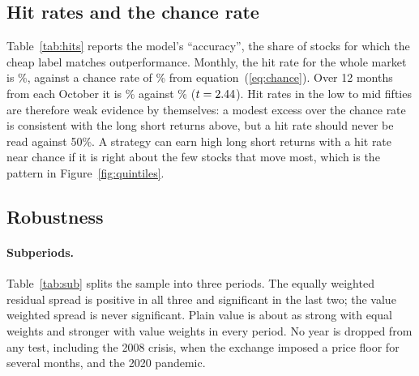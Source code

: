 \documentclass[11pt]{article}
\begin{document}
\subsection{Hit rates and the chance rate}

Table~\ref{tab:hits} reports the model's ``accuracy'', the share of stocks for which the cheap label
matches outperformance. Monthly, the hit rate for the whole market is \HitM\%, against a chance rate
of \BaseM\% from equation~(\ref{eq:chance}). Over 12 months from each October it is \HitA\% against
\BaseA\% ($t = 2.44{}$). Hit rates in the low to mid fifties are therefore weak evidence by
themselves: a modest excess over the chance rate is consistent with the long short returns above,
but a hit rate should never be read against 50\%. A strategy can earn high long short returns with a
hit rate near chance if it is right about the few stocks that move most, which is the pattern in
Figure~\ref{fig:quintiles}.

\begin{table}[htbp]
\centering\small
\caption{Hit rates. A hit is a stock labelled cheap (negative residual) that beats the cross
sectional average return, or one labelled dear that does not. The chance rate is equation
(\ref{eq:chance}). Excess is the average of hit rate minus chance rate, in percentage points; $t$
statistics in parentheses. The 12 month test forms signals at the end of each October.}
\label{tab:hits}

\end{table}

\subsection{Robustness}

\paragraph{Subperiods.} Table~\ref{tab:sub} splits the sample into three periods. The equally weighted
residual spread is positive in all three and significant in the last two; the value weighted spread
is never significant. Plain value is about as strong with equal weights and stronger with value weights in every period. No year is dropped from any
test, including the 2008 crisis, when the exchange imposed a price floor for several months, and the
2020 pandemic.

\begin{table}[htbp]
\centering\small
\caption{Long short returns by subperiod, percent per month, Newey and West $t$ statistics in
parentheses.}
\label{tab:sub}

\end{table}
\end{document}
